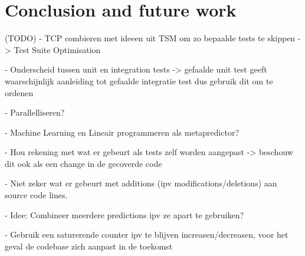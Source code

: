 \chapter{Conclusion and future work}

(TODO)
- TCP combieren met ideeen uit TSM om zo bepaalde tests te skippen -> Test Suite Optimisation

- Onderscheid tussen unit en integration tests -> gefaalde unit test geeft waarschijnlijk aanleiding tot gefaalde integratie test dus gebruik dit om te ordenen

- Parallelliseren?

- Machine Learning en Lineair programmeren als metapredictor?

- Hou rekening met wat er gebeurt als tests zelf worden aangepast -> beschouw dit ook als een change in de gecoverde code

- Niet zeker wat er gebeurt met additions (ipv modifications/deletions) aan source code lines.

- Idee: Combineer meerdere predictions ipv ze apart te gebruiken?

- Gebruik een saturerende counter ipv te blijven increasen/decreasen, voor het geval de codebase zich aanpast in de toekomst









